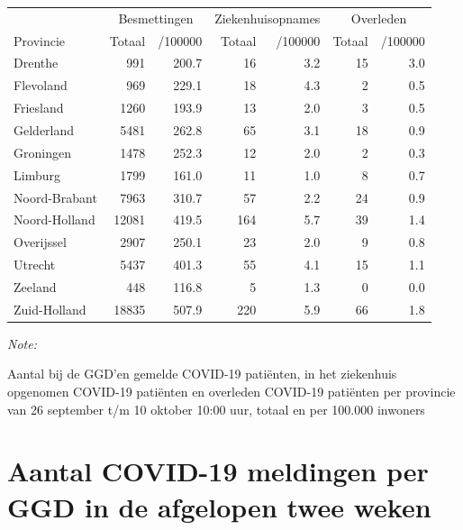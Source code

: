 \documentclass[
  english,
  man,floatsintext]{apa6}
\begin{document}
\begin{table}[H]
\centering
\begin{threeparttable}
\begin{tabular}{lrrrrrr}
\toprule
\multicolumn{1}{c}{ } & \multicolumn{2}{c}{Besmettingen} & \multicolumn{2}{c}{Ziekenhuisopnames} & \multicolumn{2}{c}{Overleden} \\
\cmidrule(l{3pt}r{3pt}){2-3} \cmidrule(l{3pt}r{3pt}){4-5} \cmidrule(l{3pt}r{3pt}){6-7}
Provincie & Totaal & /100000 & Totaal & /100000 & Totaal & /100000\\
\midrule
Drenthe & 991 & 200.7 & 16 & 3.2 & 15 & 3.0\\
Flevoland & 969 & 229.1 & 18 & 4.3 & 2 & 0.5\\
Friesland & 1260 & 193.9 & 13 & 2.0 & 3 & 0.5\\
Gelderland & 5481 & 262.8 & 65 & 3.1 & 18 & 0.9\\
Groningen & 1478 & 252.3 & 12 & 2.0 & 2 & 0.3\\
Limburg & 1799 & 161.0 & 11 & 1.0 & 8 & 0.7\\
Noord-Brabant & 7963 & 310.7 & 57 & 2.2 & 24 & 0.9\\
Noord-Holland & 12081 & 419.5 & 164 & 5.7 & 39 & 1.4\\
Overijssel & 2907 & 250.1 & 23 & 2.0 & 9 & 0.8\\
Utrecht & 5437 & 401.3 & 55 & 4.1 & 15 & 1.1\\
Zeeland & 448 & 116.8 & 5 & 1.3 & 0 & 0.0\\
Zuid-Holland & 18835 & 507.9 & 220 & 5.9 & 66 & 1.8\\
\bottomrule
\end{tabular}
\begin{tablenotes}
\item \textit{Note: } 
\item Aantal bij de GGD’en gemelde COVID-19 patiënten, in het ziekenhuis opgenomen COVID-19 patiënten en overleden COVID-19 patiënten per provincie van 26 september t/m 10 oktober 10:00 uur, totaal en per 100.000 inwoners
\end{tablenotes}
\end{threeparttable}
\end{table}

\newpage

\hypertarget{aantal-covid-19-meldingen-per-ggd-in-de-afgelopen-twee-weken}{%
\section{Aantal COVID-19 meldingen per GGD in de afgelopen twee weken}\label{aantal-covid-19-meldingen-per-ggd-in-de-afgelopen-twee-weken}}
\end{document}
